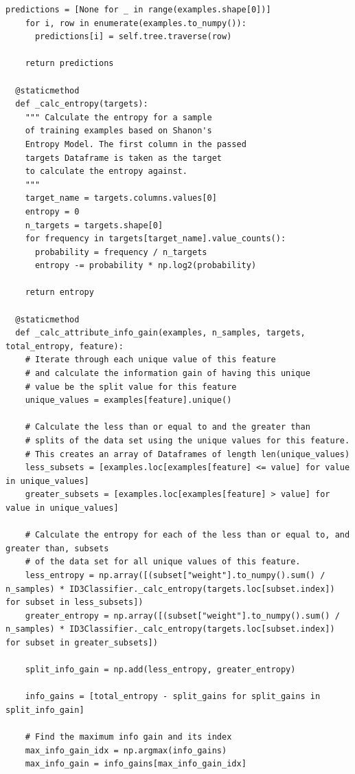 \documentclass[a4paper]{article}
\begin{document}
\begin{lstlisting}[basicstyle= \scriptsize]
    predictions = [None for _ in range(examples.shape[0])]
    for i, row in enumerate(examples.to_numpy()):
      predictions[i] = self.tree.traverse(row) 

    return predictions
  
  @staticmethod
  def _calc_entropy(targets):
    """ Calculate the entropy for a sample
    of training examples based on Shanon's 
    Entropy Model. The first column in the passed
    targets Dataframe is taken as the target
    to calculate the entropy against.
    """
    target_name = targets.columns.values[0]
    entropy = 0
    n_targets = targets.shape[0]
    for frequency in targets[target_name].value_counts():
      probability = frequency / n_targets 
      entropy -= probability * np.log2(probability)

    return entropy

  @staticmethod
  def _calc_attribute_info_gain(examples, n_samples, targets, total_entropy, feature):
    # Iterate through each unique value of this feature
    # and calculate the information gain of having this unique
    # value be the split value for this feature 
    unique_values = examples[feature].unique()

    # Calculate the less than or equal to and the greater than
    # splits of the data set using the unique values for this feature.
    # This creates an array of Dataframes of length len(unique_values)
    less_subsets = [examples.loc[examples[feature] <= value] for value in unique_values] 
    greater_subsets = [examples.loc[examples[feature] > value] for value in unique_values]

    # Calculate the entropy for each of the less than or equal to, and greater than, subsets 
    # of the data set for all unique values of this feature.
    less_entropy = np.array([(subset["weight"].to_numpy().sum() / n_samples) * ID3Classifier._calc_entropy(targets.loc[subset.index]) for subset in less_subsets])
    greater_entropy = np.array([(subset["weight"].to_numpy().sum() / n_samples) * ID3Classifier._calc_entropy(targets.loc[subset.index]) for subset in greater_subsets])

    split_info_gain = np.add(less_entropy, greater_entropy)

    info_gains = [total_entropy - split_gains for split_gains in split_info_gain]

    # Find the maximum info gain and its index
    max_info_gain_idx = np.argmax(info_gains)
    max_info_gain = info_gains[max_info_gain_idx]


\end{lstlisting}
\end{document}
